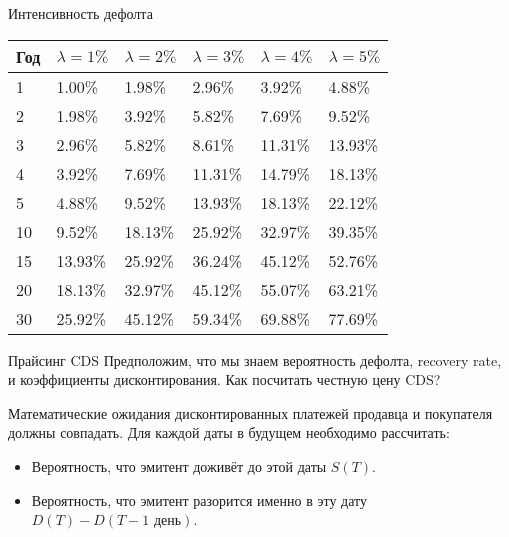 \documentclass{beamer}
\begin{document}
\begin{frame}{Интенсивность дефолта}
\centering
\begin{tabular}{l|l|l|l|l|l}
Год & $\lambda=1\%$ & $\lambda=2\%$ &  $\lambda=3\%$ & $\lambda=4\%$ & $\lambda=5\%$ \\
\hline
1	& 1.00\%	& 1.98\%	& 2.96\%	& 3.92\%	& 4.88\% \\
2	& 1.98\%	& 3.92\%	& 5.82\%	& 7.69\%	& 9.52\% \\
3	& 2.96\%	& 5.82\%	& 8.61\%	& 11.31\%	& 13.93\% \\
4	& 3.92\%	& 7.69\%	& 11.31\%	& 14.79\%	& 18.13\% \\
5	& 4.88\%	& 9.52\%	& 13.93\%	& 18.13\%	& 22.12\% \\
10	& 9.52\%	& 18.13\%	& 25.92\%	& 32.97\%	& 39.35\% \\
15	& 13.93\%	& 25.92\%	& 36.24\%	& 45.12\%	& 52.76\% \\
20  & 18.13\%	& 32.97\%	& 45.12\%	& 55.07\%	& 63.21\% \\
30  & 25.92\%	& 45.12\%	& 59.34\%	& 69.88\%	& 77.69\%
\end{tabular}
\end{frame}



\begin{frame}{Прайсинг CDS}
\justify
Предположим, что мы знаем вероятность дефолта, recovery rate, и коэффициенты дисконтирования. Как посчитать честную цену CDS?

\vspace{\baselineskip}
Математические ожидания дисконтированных платежей продавца и покупателя должны совпадать. Для каждой даты в будущем необходимо рассчитать:
\begin{itemize}
\item Вероятность, что эмитент доживёт до этой даты $S(T)$.
\item Вероятность, что эмитент разорится именно в эту дату $D(T) - D(T - 1 \text{ день})$.
\end{itemize}
\end{frame}
\end{document}

